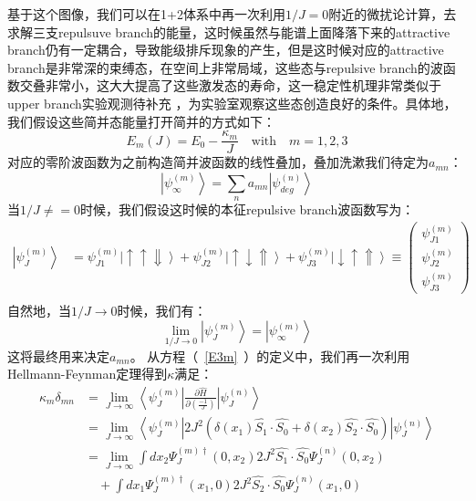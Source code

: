 基于这个图像，我们可以在1+2体系中再一次利用$1/J=0$附近的微扰论计算，去求解三支repulsuve branch的能量，这时候虽然与能谱上面降落下来的attractive branch仍有一定耦合，导致能级排斥现象的产生，但是这时候对应的attractive branch是非常深的束缚态，在空间上非常局域，这些态与repulsive branch的波函数交叠非常小，这大大提高了这些激发态的寿命，这一稳定性机理非常类似于{\color{red} upper branch实验观测待补充 }，为实验室观察这些态创造良好的条件。具体地，我们假设这些简并态能量打开简并的方式如下：
\begin{equation}
    E_m(J) = E_0 - \frac{\kappa_m }{J} \quad \text{with}  \quad m =1,2,3  \label{E3m}
\end{equation}
对应的零阶波函数为之前构造简并波函数的线性叠加，叠加洗漱我们待定为$a_{mn}$：
    \begin{equation}
        \left|\psi^{(m)}_{\infty} \right> = \sum_n a_{mn} \left|\psi^{(n)}_{deg}\right>
    \end{equation}
当$1/J\neq=0$时候，我们假设这时候的本征repulsive branch波函数写为：
    \begin{equation}
        \begin{split}
            \left|\psi^{(m)}_J\right> &=  \psi^{(m)}_{J1}\left|\uparrow \uparrow \Downarrow \right> + \psi^{(m)}_{J2} \left|\uparrow \downarrow \Uparrow \right>  +\psi^{(m)}_{J3} \left|\downarrow \uparrow \Uparrow \right> \equiv\left(
            \begin{array}{c}
                \psi_{J1}^{(m)} \\
                \psi_{J2}^{(m)}\\
                \psi_{J3}^{(m)}
            \end{array}
            \right)\\
        \end{split} \label{eq2}
    \end{equation} 
自然地，当$1/J\to0$时候，我们有：
\begin{equation}\label{infcond}
    \lim_{1/J\to0} \left|\psi^{(m)}_J\right>  = \left|\psi^{(m)}_{\infty} \right>
\end{equation}
这将最终用来决定$a_{mn}$。
从方程（~\ref{E3m}~）的定义中，我们再一次利用Hellmann-Feynman定理得到$\kappa$满足：
    \begin{equation}
        \begin{split}
            \kappa_m \delta_{mn} &= \lim_{J\to \infty} \left<\psi^{(m)}_J\right| \frac{\partial\hat{H}}{\partial(\frac{-1}{J})} \left|\psi^{(n)}_{J}\right>\\
                &= \lim_{J\to \infty} \left<\psi^{(m)}_J\right| 2J^2(\delta(x_1)\hat{S_1}\cdot \hat{S_0}+\delta(x_2)\hat{S_2}\cdot \hat{S_0}) \left|\psi^{(n)}_{J}\right>\\
                &= \lim_{J\to \infty} \int  dx_2 \Psi^{(m)\dagger}_J(0,x_2) 2J^2 \hat{S_1}\cdot \hat{S_0} \Psi^{(n)}_J(0,x_2) \\
                &\quad + \int dx_1 \Psi^{(m)\dagger}_J(x_1,0) 2J^2 \hat{S_2}\cdot \hat{S_0} \Psi^{(n)}_J(x_1,0) \\
        \end{split} \label{kappam}
    \end{equation}
